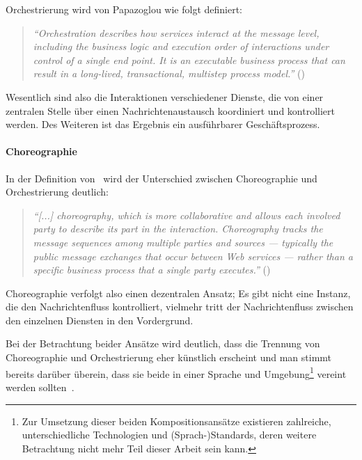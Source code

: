   Orchestrierung wird von Papazoglou wie folgt definiert:
  
  \begin{quote}
    \emph{"`Orchestration describes how services interact at the message level, including the business logic and execution order of interactions under control of a single end point. It is an executable business process that can result in a long-lived, transactional, multistep process model."'} (\citep[S. 41]{papazoglou2007soc})
  \end{quote}
  
  Wesentlich sind also die Interaktionen verschiedener Dienste, die von einer zentralen Stelle über einen Nachrichtenaustausch koordiniert und kontrolliert werden. Des Weiteren ist das Ergebnis ein ausführbarer Geschäftsprozess.


\paragraph{Choreographie} %
\label{par:choreographie}

  In der Definition von~\citep{peltz2003wso} wird der Unterschied zwischen Choreographie und Orchestrierung deutlich:
  
  \begin{quote}
    \emph{"`[...] choreography, which is more collaborative and allows each involved party to describe its part in the interaction. Choreography tracks the message sequences among multiple parties and sources --- typically the public message exchanges that occur between Web services --- rather than a specific business process that a single party executes."'} (\citep[S. 46]{peltz2003wso})
  \end{quote}

  Choreographie verfolgt also einen dezentralen Ansatz; Es gibt nicht eine Instanz, die den Nachrichtenfluss kontrolliert, vielmehr tritt der Nachrichtenfluss zwischen den einzelnen Diensten in den Vordergrund.
  
  Bei der Betrachtung beider Ansätze wird deutlich, dass die Trennung von Choreographie und Orchestrierung eher künstlich erscheint und man stimmt bereits darüber überein, dass sie beide in einer Sprache und Umgebung\footnote{Zur Umsetzung dieser beiden Kompositionsansätze existieren zahlreiche, unterschiedliche Technologien und (Sprach-)Standards, deren weitere Betrachtung nicht mehr Teil dieser Arbeit sein kann.} vereint werden sollten~\citep[S. 42]{papazoglou2007soc}.

